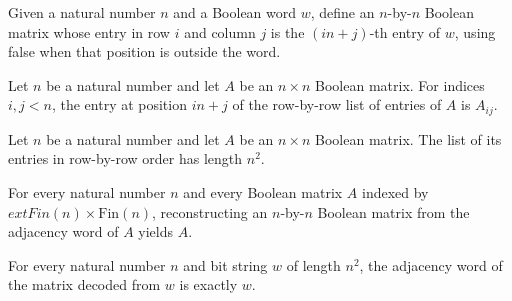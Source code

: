 \begin{definition}
\label{Randomized.Matching.adjOfWord}
\leanok
Given a natural number $n$ and a Boolean word $w$, define an $n$-by-$n$ Boolean matrix
whose entry in row $i$ and column $j$ is the $(in+j)$-th entry of $w$, using false when
that position is outside the word.
\end{definition}

\begin{theorem}
\label{Randomized.Matching.getD_adjWord}
\leanok
{}
Let $n$ be a natural number and let $A$ be an $n\times n$ Boolean matrix. For indices
$i,j<n$, the entry at position $in+j$ of the row-by-row list of entries of $A$ is
$A_{ij}$.
\end{theorem}

\begin{theorem}
\label{Randomized.Matching.length_adjWord}
\leanok
{}
Let $n$ be a natural number and let $A$ be an $n\times n$ Boolean matrix. The list of
its entries in row-by-row order has length $n^2$.
\end{theorem}

\begin{theorem}
\label{Randomized.Matching.adjOfWord_adjWord}
\leanok
{}
For every natural number $n$ and every Boolean matrix $A$ indexed by $	ext{Fin}(n)
\times \text{Fin}(n)$, reconstructing an $n$-by-$n$ Boolean matrix from the adjacency
word of $A$ yields $A$.
\end{theorem}

\begin{theorem}
\label{Randomized.Matching.adjWord_adjOfWord}
\leanok
{}
For every natural number $n$ and bit string $w$ of length $n^2$, the adjacency word of
the matrix decoded from $w$ is exactly $w$.
\end{theorem}

